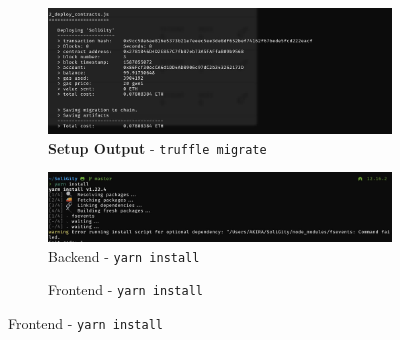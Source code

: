 \documentclass[12pt]{article}
\renewcommand{\_}{\kern-1.5pt\textunderscore\kern-1.5pt}
\begin{document}
\begin{figure}[H]
\begin{minipage}[t]{0.4\linewidth}
				   	\begin{subfigure}[t]{1.2\textwidth}
	\captionsetup{justification   = raggedright,
              singlelinecheck = false}
		\centering
				\caption*{\textbf{Setup Output} - \texttt{truffle migrate}}
		\includegraphics[width=\textwidth]{graphs/07. truffle_migrate}
	\end{subfigure}
	\end{minipage}\hfill
	\begin{minipage}[t]{0.5\linewidth}
			\begin{subfigure}[b]{\textwidth}
				\captionsetup{justification   = raggedright,
              singlelinecheck = false}
			\centering
						\caption*{Backend - \texttt{yarn install}}

			\includegraphics[width=\textwidth]{graphs/02. yarn_install_backend}

		\end{subfigure}


					\begin{subfigure}[b]{\textwidth}
				\captionsetup{justification   = raggedright,
              singlelinecheck = false}
			\centering
						\caption*{Frontend - \texttt{yarn install}}


\end{subfigure}
\end{minipage}
\end{figure}
\end{document}
